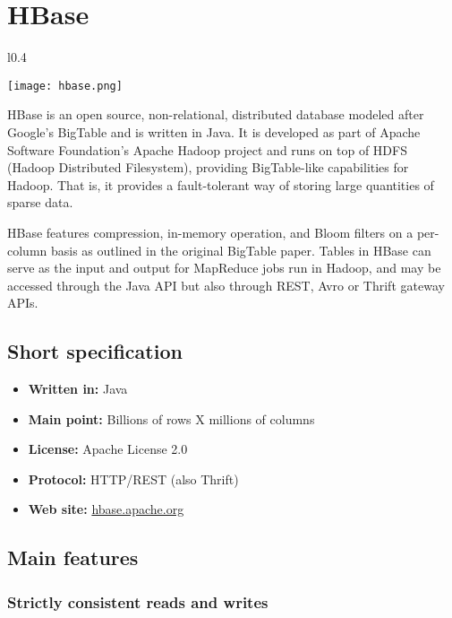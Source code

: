 \chapter{HBase}

\begin{wrapfigure}{l}{0.4\textwidth}
  \vspace{-75pt}
  \begin{center}
    \texttt{[image: hbase.png]}
  \end{center}
  \vspace{-30pt}
\end{wrapfigure}
HBase is an open source, non-relational, distributed database modeled after Google's BigTable and is written in Java. It is developed as part of Apache Software Foundation's Apache Hadoop project and runs on top of HDFS (Hadoop Distributed Filesystem), providing BigTable-like capabilities for Hadoop. That is, it provides a fault-tolerant way of storing large quantities of sparse data.

HBase features compression, in-memory operation, and Bloom filters on a per-column basis as outlined in the original BigTable paper. Tables in HBase can serve as the input and output for MapReduce jobs run in Hadoop, and may be accessed through the Java API but also through REST, Avro or Thrift gateway APIs.

\section{Short specification}

\begin{itemize}
  \item \textbf{Written in:} Java
  \item \textbf{Main point:} Billions of rows X millions of columns
  \item \textbf{License:} Apache License 2.0
  \item \textbf{Protocol:} HTTP/REST (also Thrift)
  \item \textbf{Web site:} \href{http://hbase.apache.org/}{hbase.apache.org}
\end{itemize}

\section{Main features}

\subsection{Strictly consistent reads and writes}

